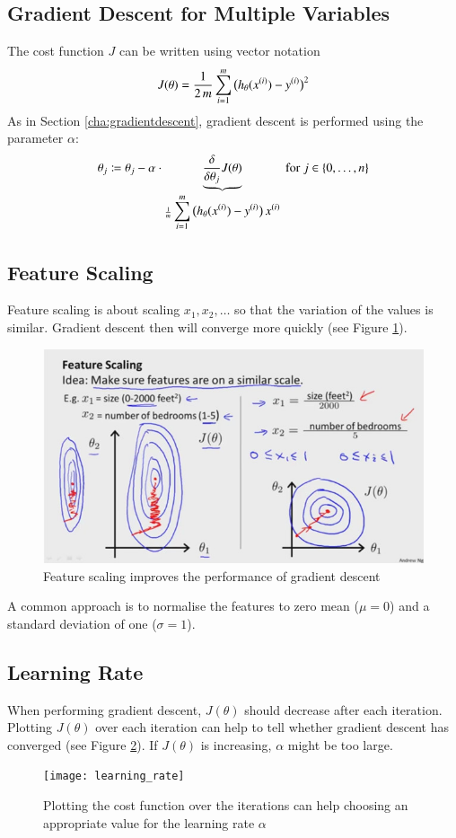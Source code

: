 \documentclass[a4paper,twoside,10pt]{article}
\begin{document}
\subsection{Gradient Descent for Multiple Variables}\label{cha:linearregression}
The cost function $J$ can be written using vector notation
\begin{equation*}
  J(\theta)=\frac{1}{2\,m}\displaystyle\sum_{i=1}^m\big(h_\theta(x^{(i)})-y^{(i)}\big)^2
\end{equation*}
As in Section \ref{cha:gradientdescent}, gradient descent is performed using the parameter $\alpha$:
\begin{equation*}
  \theta_j\coloneqq\theta_j-\alpha\cdot\underbrace{\frac{\delta}{\delta\theta_j}J(\theta)}_
  {\frac{1}{m}\sumi\big(h_\theta(\sxi)-\syi\big)\,\sxi}\mathrm{\ for\ }j\in\{0,\ldots,n\}
\end{equation*}

\subsection{Feature Scaling}
Feature scaling is about scaling $x_1,x_2,\ldots$ so that the variation of the values is similar.
Gradient descent then will converge more quickly (see Figure \ref{fig:scaling}).
\begin{figure}[htbp]
  \begin{center}
    \includegraphics[width=.6\textwidth]{scaling}
    \caption{Feature scaling improves the performance of gradient descent\citep{andrewng}\label{fig:scaling}}
  \end{center}
\end{figure}
A common approach is to normalise the features to zero mean ($\mu=0$) and a standard deviation of one ($\sigma=1$).

\subsection{Learning Rate}
When performing gradient descent, $J(\theta)$ should decrease after each iteration.
Plotting $J(\theta)$ over each iteration can help to tell whether gradient descent has converged (see Figure \ref{fig:alphas}).
If $J(\theta)$ is increasing, $\alpha$ might be too large.
\begin{figure}[htbp]
  \begin{center}
    \texttt{[image: learning\_rate]}
  \caption{Plotting the cost function over the iterations can help choosing an appropriate value for the learning rate $\alpha$\label{fig:alphas}}
  \end{center}
\end{figure}
\end{document}

